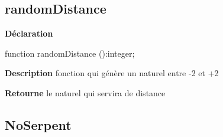\documentclass{report}
\newif\ifpdf
\begin{document}
\subsection*{randomDistance}
\fi
\label{Generation-randomDistance}
\begin{list}{}{
\setlength{\itemindent}{0cm}
\setlength{\listparindent}{0cm}
\setlength{\leftmargin}{\evensidemargin}
\addtolength{\leftmargin}{\tmplength}
\settowidth{\labelsep}{X}
\addtolength{\leftmargin}{\labelsep}
\setlength{\labelwidth}{\tmplength}
}
\item[\textbf{Déclaration}\hfill]
\ifpdf
\begin{flushleft}
\fi
\begin{ttfamily}
function randomDistance ():integer;\end{ttfamily}

\ifpdf
\end{flushleft}
\fi

\par
\item[\textbf{Description}]
fonction qui génère un naturel entre {-}2 et +2 \par
\item[\textbf{Retourne}]le naturel qui servira de distance


\end{list}
\ifpdf
\subsection*{\large{\textbf{NoSerpent}}\normalsize\hspace{1ex}\hrulefill}
\else
\end{document}
